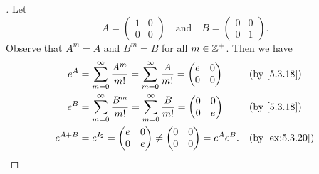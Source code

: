 \begin{proof}[]
	Let
	\[
		A = \begin{pmatrix}
			1 & 0 \\
			0 & 0
		\end{pmatrix} \quad \text{and} \quad B = \begin{pmatrix}
			0 & 0 \\
			0 & 1
		\end{pmatrix}.
	\]
	Observe that \(A^m = A\) and \(B^m = B\) for all \(m \in \mathbb{Z}^+\).
	Then we have
	\begin{align*}
		e^A       & = \sum_{m = 0}^\infty \frac{A^m}{m!} = \sum_{m = 0}^\infty \frac{A}{m!} = \begin{pmatrix}
			                                                                                      e & 0 \\
			                                                                                      0 & 0
		                                                                                      \end{pmatrix} &  & \by{5.3.18}                           \\
		e^B       & = \sum_{m = 0}^\infty \frac{B^m}{m!} = \sum_{m = 0}^\infty \frac{B}{m!} = \begin{pmatrix}
			                                                                                      0 & 0 \\
			                                                                                      0 & e
		                                                                                      \end{pmatrix} &  & \by{5.3.18}                           \\
		e^{A + B} & = e^{I_2} = \begin{pmatrix}
			                        e & 0 \\
			                        0 & e
		                        \end{pmatrix} \neq \begin{pmatrix}
			                                           0 & 0 \\
			                                           0 & 0
		                                           \end{pmatrix} = e^A e^B.                                                        &  & \by{ex:5.3.20}
	\end{align*}
\end{proof}

